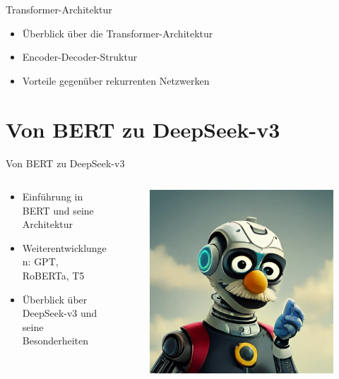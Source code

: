 \documentclass[aspectratio=1610, xcolor=dvipsnames, 9pt]{beamer}
\begin{document}
\begin{frame}{Transformer-Architektur}
  \begin{itemize}
    \item Überblick über die Transformer-Architektur
    \item Encoder-Decoder-Struktur
    \item Vorteile gegenüber rekurrenten Netzwerken
  \end{itemize}
\end{frame}

\section{Von BERT zu DeepSeek-v3}

\begin{frame}{Von BERT zu DeepSeek-v3}
  \begin{columns}
    \begin{column}{0.5\textwidth}
      \begin{itemize}
        \item Einführung in BERT und seine Architektur
        \item Weiterentwicklungen: GPT, RoBERTa, T5
        \item Überblick über DeepSeek-v3 und seine Besonderheiten
      \end{itemize}
        \end{column}
          \begin{column}{0.5\textwidth}
              \begin{figure}
          \centering
            \includegraphics[height=0.35\textheight]{images/mechaBERT.png}

\end{figure}
\end{column}
\end{columns}
\end{frame}
\end{document}
